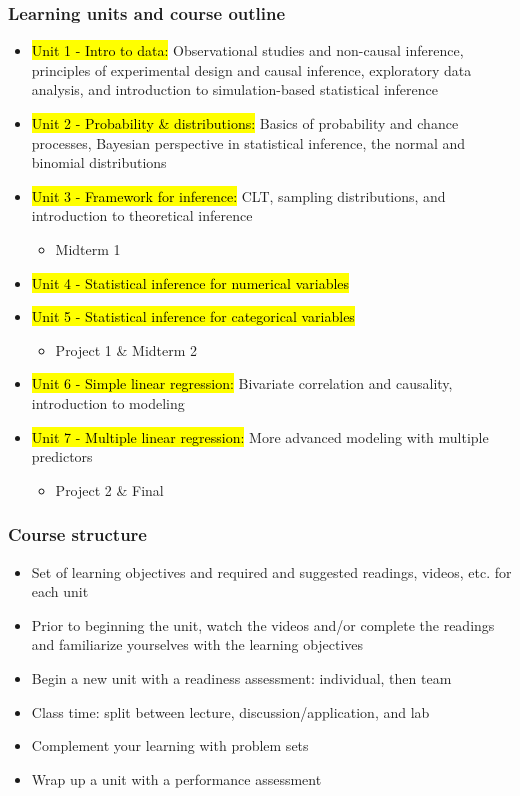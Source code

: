 \documentclass[11pt,containsverbatim,handout,xcolor=xelatex,dvipsnames,table]{beamer}
\begin{document}
\begin{frame}
\frametitle{Learning units and course outline}

{\footnotesize
\begin{itemize}[<+->]
\item \hl{Unit 1 - Intro to data:} Observational studies and non-causal inference, principles of experimental design and causal inference, exploratory data analysis, and introduction to simulation-based statistical inference
\item \hl{Unit 2 - Probability \& distributions:} Basics of probability and chance processes, Bayesian perspective in statistical inference, the normal and binomial distributions
\item \hl{Unit 3 - Framework for inference:} CLT, sampling distributions, and introduction to theoretical inference
\begin{itemize}
\item Midterm 1
\end{itemize}
\item \hl{Unit 4 - Statistical inference for numerical variables}
\item \hl{Unit 5 - Statistical inference for categorical variables}
\begin{itemize}
\item Project 1 \& Midterm 2
\end{itemize}
\item \hl{Unit 6 - Simple linear regression:} Bivariate correlation and causality, introduction to modeling
\item \hl{Unit 7 - Multiple linear regression:} More advanced modeling with multiple predictors
\begin{itemize}
\item Project 2 \& Final
\end{itemize}
\end{itemize}
}

\end{frame}


\begin{frame}
\frametitle{Course structure}

\begin{itemize}[<alert@+>]
\item Set of learning objectives and required and suggested readings, videos, etc. for each unit
\item Prior to beginning the unit, watch the videos and/or complete the readings and familiarize yourselves with the learning objectives
\item Begin a new unit with a readiness assessment: individual, then team 
\item Class time: split between lecture, discussion/application, and lab
\item Complement your learning with problem sets
\item Wrap up a unit with a performance assessment
\end{itemize}

\end{frame}
\end{document}
